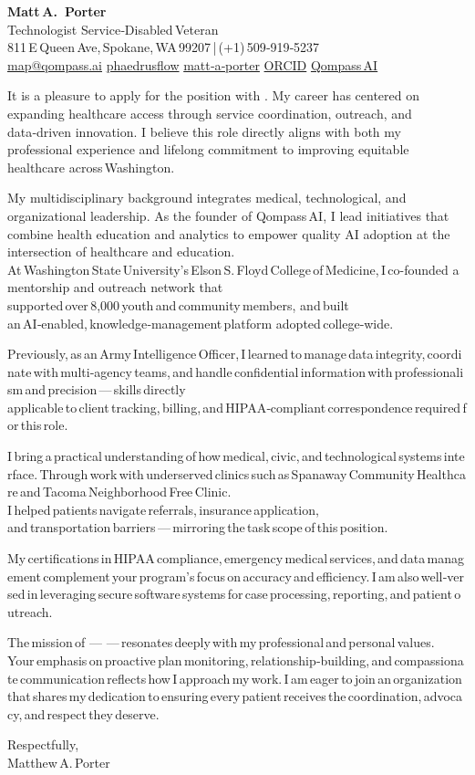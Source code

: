 \documentclass[11pt,a4paper]{awesome-cv}
\makeatletter
\providecommand{\namefont}{\fontfamily{phv}\selectfont\fontsize{24pt}{28pt}\bfseries}
\newcommand*\CustomHeader{%
  \begin{center}
  {\namefont Matt A.~Porter\\[3pt]}
  {\small Technologist {\Large\textperiodcentered} Service‑Disabled Veteran}\\[3pt]
  811 E Queen Ave, Spokane, WA 99207 \quad|\quad (+1) 509‑919‑5237\\[3pt]
  \href{mailto:map@qompass.ai}{\faEnvelope\enskip map@qompass.ai}\enskip
  \href{https://github.com/phaedrusflow}{\faGithub\enskip phaedrusflow}\enskip
  \href{https://www.linkedin.com/in/matt-a-porter-103535224}{\faLinkedin\enskip matt‑a‑porter}\enskip
  \href{https://orcid.org/0000-0002-0302-4812}{\faOrcid\enskip ORCID}\enskip
  \href{https://www.youtube.com/@qompassai}{\faIcon{youtube}\enskip Qompass AI}
\end{center}
\vspace{1.2em}
}
\makeatother
\begin{document}
\setlength{\parskip}{0.8em}
\setlength{\parindent}{0pt}
\linespread{1.15}
\justifying
\CustomHeader
{}

\makelettertitle
\begin{cvletter}
	\RaggedRight

	It is a pleasure to apply for the \textbf{\JobTitle} position with \CompanyName. My career has centered on expanding healthcare access through service coordination, outreach, and data‑driven innovation. I believe this role directly aligns with both my professional experience and lifelong commitment to improving equitable healthcare across Washington.

	My multidisciplinary background integrates medical, technological, and organizational leadership. As the founder of Qompass AI, I lead initiatives that combine health education and analytics to empower quality AI adoption at the intersection of healthcare and education. At Washington State University’s Elson S. Floyd College of Medicine, I co-founded a mentorship and outreach network that supported over 8,000 youth and community members, and built an AI‑enabled, knowledge‑management platform adopted college‑wide.

	Previously, as an Army Intelligence Officer, I learned to manage data integrity, coordinate with multi‑agency teams, and handle confidential information with professionalism and precision — skills directly applicable to client tracking, billing, and HIPAA‑compliant correspondence required for this role.

	I bring a practical understanding of how medical, civic, and technological systems interface. Through work with underserved clinics such as Spanaway Community Healthcare and Tacoma Neighborhood Free Clinic. I helped patients navigate referrals, insurance application, and transportation barriers — mirroring the task scope of this position.

	My certifications in HIPAA compliance, emergency medical services, and data management complement your program’s focus on accuracy and efficiency. I am also well‑versed in leveraging secure software systems for case processing, reporting, and patient outreach.

	The mission of \CompanyName{} — \emph{\CompanyMission{}} — resonates deeply with my professional and personal values. Your emphasis on proactive plan monitoring, relationship‑building, and compassionate communication reflects how I approach my work. I am eager to join an organization that shares my dedication to ensuring every patient receives the coordination, advocacy, and respect they deserve.

\vspace{1.5em}
\noindent
Respectfully,\\[1em]
Matthew A. Porter

\end{cvletter}
\end{document}
